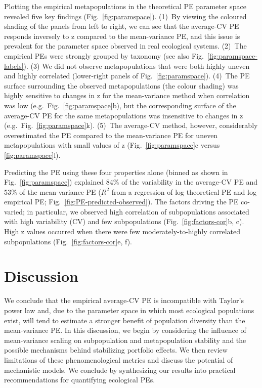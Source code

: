 Plotting the empirical metapopulations in the theoretical PE parameter space
revealed five key findings (Fig.~\ref{fig:paramspace}).
(1)~By viewing the coloured shading of the panels from left to right, we
can see that the average-CV PE responds inversely to z compared to the
mean-variance PE, and this issue is prevalent for the parameter space observed
in real ecological systems.
(2)~The empirical PEs were strongly grouped by taxonomy (see also
Fig.~\ref{fig:paramspace-labels}).
(3)
We did not observe metapopulations that were both highly
uneven and highly correlated (lower-right panels of Fig.~\ref{fig:paramspace}).
(4)~The PE surface surrounding the observed metapopulations (the colour
shading) was highly sensitive to changes in z for the mean-variance method when
correlation was low (e.g.\ Fig.~\ref{fig:paramspace}b), but the corresponding
surface of the average-CV PE for the same metapopulations was insensitive to
changes in z (e.g.\ Fig.~\ref{fig:paramspace}k).
(5)~The average-CV method,
however, considerably overestimated the PE compared to the mean-variance PE for
uneven metapopulations with small values of z (Fig.~\ref{fig:paramspace}c
versus \ref{fig:paramspace}l).

Predicting the PE using these four properties alone (binned as shown in
Fig.~\ref{fig:paramspace}) explained
84\% of the variability in the average-CV PE and
53\% of the mean-variance PE ($R^2$ from a regression
of log theoretical PE and log empirical PE;
Fig.~\ref{fig:PE-predicted-observed}). The factors driving the PE co-varied; in
particular, we observed high correlation of subpopulations associated with high
variability (CV) and few subpopulations (Fig.~\ref{fig:factors-cor}b, c). High z
values occurred when there were few moderately-to-highly correlated
subpopulations (Fig.~\ref{fig:factors-cor}e, f).

\section{Discussion}

We conclude that the empirical average-CV PE is incompatible with Taylor's power
law and, due to the parameter space in which most ecological populations exist,
will tend to estimate a stronger benefit of population diversity than the
mean-variance PE. In this discussion, we begin by considering the influence of
mean-variance scaling on subpopulation and metapopulation stability and the
possible mechanisms behind stabilizing portfolio effects.
We then review limitations of these phenomenological metrics and discuss the
potential of mechanistic models. We conclude by synthesizing our results into
practical recommendations for quantifying ecological PEs.

